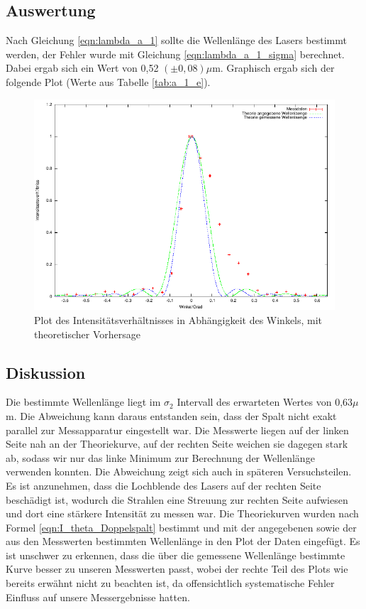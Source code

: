 \documentclass[12pt]{scrartcl}
\begin{document}
\subsection{Auswertung}
Nach Gleichung \ref{eqn:lambda_a_1} sollte die Wellenlänge des Lasers bestimmt werden, der Fehler wurde mit Gleichung \ref{eqn:lambda_a_1_sigma} berechnet. Dabei ergab sich ein Wert von 0,52 $(\pm 0,08) \mu$m. Graphisch ergab sich der folgende Plot (Werte aus Tabelle \ref{tab:a_1_e}).

\begin{figure}[H]
\centering
    \includegraphics[scale = 1]{a_1.pdf}
  	\caption[Plot des Intensitätsverhältnisses in Abhängigkeit des Winkels, mit theoretischer Vorhersage]{Plot des Intensitätsverhältnisses in Abhängigkeit des Winkels, mit theoretischer Vorhersage}
  \label{fig:a_1}
\end{figure}

\subsection{Diskussion}
Die bestimmte Wellenlänge liegt im $\sigma_2$ Intervall des erwarteten Wertes von 0,63$\mu$m. Die Abweichung kann daraus entstanden sein, dass der Spalt nicht exakt parallel zur Messapparatur eingestellt war.
Die Messwerte liegen auf der linken Seite nah an der Theoriekurve, auf der rechten Seite weichen sie dagegen stark ab, sodass wir nur das linke Minimum zur Berechnung der Wellenlänge verwenden konnten. Die Abweichung zeigt sich auch in späteren Versuchsteilen. Es ist anzunehmen, dass die Lochblende des Lasers auf der rechten Seite beschädigt ist, wodurch die Strahlen eine Streuung zur rechten Seite aufwiesen und dort eine stärkere Intensität zu messen war.
Die Theoriekurven wurden nach Formel \ref{eqn:I_theta_Doppelspalt} bestimmt und mit der angegebenen sowie der aus den Messwerten bestimmten Wellenlänge in den Plot der Daten eingefügt. Es ist unschwer zu erkennen, dass die über die gemessene Wellenlänge bestimmte Kurve besser zu unseren Messwerten passt, wobei der rechte Teil des Plots wie bereits erwähnt nicht zu beachten ist, da offensichtlich  systematische Fehler Einfluss auf unsere Messergebnisse hatten.
\end{document}
